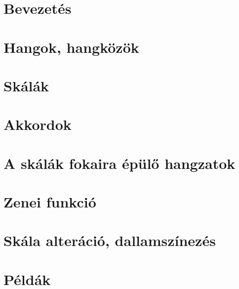 
 
 





\tableofcontents

\clearpage
\section*{Bevezetés}
\label{sec:bevezetes}


\section{Hangok, hangközök}
\label{sec:hangokhangkozok}


\section{Skálák}
\label{sec:skalak}


\section{Akkordok}
\label{sec:akkordok}


\section{A skálák fokaira épülő hangzatok}
\label{sec:skalahangzat}


\section{Zenei funkció}
\label{sec:funkcio}


\section{Skála alteráció, dallamszínezés}
\label{sec:alteracio}


\clearpage
\section{Példák}
\label{sec:peldak}


\clearpage
{}
\label{sec:abrajegyzek}
\listoffigures

\clearpage
{}
\label{sec:tablajegyzek}
\listoftables

\clearpage
{}
\label{sec:targymutato}
\printindex

\clearpage
{}
\label{sec:melleklet}



